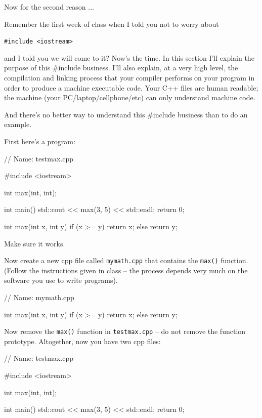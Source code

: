 
Now for the second reason ...

\newpage{}

Remember the first week of class when I told you not to worry about

\verb!#include <iostream>!

and I told you we will come to it? Now's the time. In
this section I'll explain the purpose of this \#include
business. I'll also explain, at a very high level, the
compilation and linking process that your compiler performs on your
program in order to produce a machine executable code. Your C++ files
are human readable; the machine (your PC/laptop/cellphone/etc) can only
understand machine code.

And there's no better way to understand this \#include
business than to do an example.

First here's a program:

\begin{consolethree}[escapeinside=||]
// Name: testmax.cpp

#include <iostream>

int max(int, int);

int main()
{
    std::cout << max(3, 5) << std::endl;
    return 0;
}

int max(int x, int y)
{
    if (x >= y)
        return x;
    else
        return y;
}
\end{consolethree}

Make sure it works.

Now create a new cpp file called \texttt{mymath.cpp} that contains the
\texttt{max()} function. (Follow the instructions given in class -- the
process depends very much on the software you use to write programs).

\begin{consolethree}[escapeinside=||]
// Name: mymath.cpp

int max(int x, int y)
{
    if (x >= y)
        return x;
    else
        return y;
}
\end{consolethree}

Now remove the \texttt{max()} function in \texttt{testmax.cpp} -- do not
remove the function prototype. Altogether, now you have two cpp files:

\begin{consolethree}[escapeinside=||]
// Name: testmax.cpp

#include <iostream>

int max(int, int);

int main()
{
    std::cout << max(3, 5) << std::endl;
    return 0;
}
\end{consolethree}

